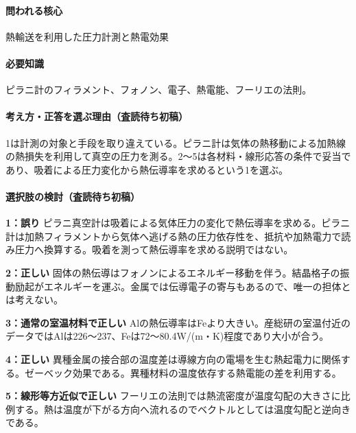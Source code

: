 \paragraph{問われる核心} 熱輸送を利用した圧力計測と熱電効果

\paragraph{必要知識} ピラニ計のフィラメント、フォノン、電子、熱電能、フーリエの法則。

\paragraph{考え方・正答を選ぶ理由（査読待ち初稿）} 1は計測の対象と手段を取り違えている。ピラニ計は気体の熱移動による加熱線の熱損失を利用して真空の圧力を測る。2〜5は各材料・線形応答の条件で妥当であり、吸着による圧力変化から熱伝導率を求めるという1を選ぶ。

\paragraph{選択肢の検討（査読待ち初稿）}\mbox{}\par

\noindent\textbf{1：誤り} ピラニ真空計は吸着による気体圧力の変化で熱伝導率を求める。ピラニ計は加熱フィラメントから気体へ逃げる熱の圧力依存性を、抵抗や加熱電力で読み圧力へ換算する。吸着を測って熱伝導率を求める説明ではない。\par

\noindent\textbf{2：正しい} 固体の熱伝導はフォノンによるエネルギー移動を伴う。結晶格子の振動励起がエネルギーを運ぶ。金属では伝導電子の寄与もあるので、唯一の担体とは考えない。\par

\noindent\textbf{3：通常の室温材料で正しい} Alの熱伝導率はFeより大きい。産総研の室温付近のデータではAlは226〜237、Feは72〜80.4W/(m・K)程度であり大小が合う。\par

\noindent\textbf{4：正しい} 異種金属の接合部の温度差は導線方向の電場を生む熱起電力に関係する。ゼーベック効果である。異種材料の温度依存する熱電能の差を利用する。\par

\noindent\textbf{5：線形等方近似で正しい} フーリエの法則では熱流密度が温度勾配の大きさに比例する。熱は温度が下がる方向へ流れるのでベクトルとしては温度勾配と逆向きである。\par

